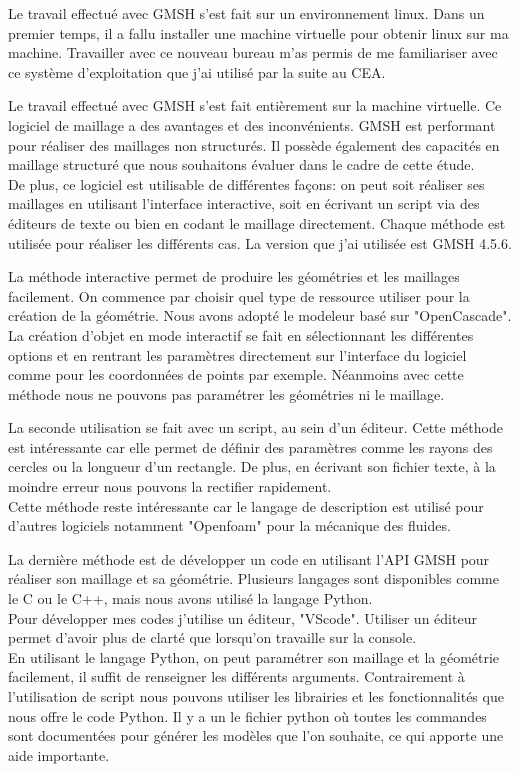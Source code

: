 Le travail effectué avec GMSH s'est fait sur un environnement linux. Dans un premier temps, il a fallu installer une machine virtuelle pour obtenir linux sur ma machine. Travailler avec ce nouveau bureau m'as permis de me familiariser avec ce système d'exploitation que j'ai utilisé par la suite au CEA.

Le travail effectué avec GMSH s'est fait entièrement sur la machine virtuelle. Ce logiciel de maillage a des avantages et des inconvénients. GMSH est performant pour réaliser des maillages non structurés. Il possède également des capacités en maillage structuré que nous souhaitons évaluer dans le cadre de cette étude.\\
De plus, ce logiciel est utilisable de différentes façons: on peut soit réaliser ses maillages en utilisant l'interface interactive, soit en écrivant un script via des éditeurs de texte ou bien en codant le maillage directement. Chaque méthode est utilisée pour réaliser les différents cas. La version que j'ai utilisée est GMSH 4.5.6.

La méthode interactive permet de produire les géométries et les maillages facilement. On commence par choisir quel type de ressource utiliser pour la création de la géométrie. Nous avons adopté le modeleur basé sur "OpenCascade".\\
La création d'objet en mode interactif se fait en sélectionnant les différentes options et en rentrant les paramètres directement sur l'interface du logiciel comme pour les coordonnées de points par exemple. Néanmoins avec cette méthode nous ne pouvons pas paramétrer les géométries ni le maillage.

La seconde utilisation se fait avec un script, au sein d'un éditeur. Cette méthode est intéressante car elle permet de définir des paramètres comme les rayons des cercles ou la longueur d'un rectangle. De plus, en écrivant son fichier texte, à la moindre erreur nous pouvons la rectifier rapidement.\\
Cette méthode reste intéressante car le langage de description est utilisé pour d'autres logiciels notamment "Openfoam" pour la mécanique des fluides.

La dernière méthode est de développer un code en utilisant l'API GMSH pour réaliser son maillage et sa géométrie. Plusieurs langages sont disponibles comme le C ou le C++, mais nous avons utilisé la langage Python.\\
Pour développer mes codes j'utilise un éditeur, "VScode". Utiliser un éditeur permet d'avoir plus de clarté que lorsqu'on travaille sur la console.\\
En utilisant le langage Python, on peut paramétrer son maillage et la géométrie facilement, il suffit de renseigner les différents arguments. Contrairement à l'utilisation de script nous pouvons utiliser les librairies et les fonctionnalités que nous offre le code Python. Il y a un le fichier python où toutes les commandes sont documentées pour générer les modèles que l'on souhaite, ce qui apporte une aide importante.

